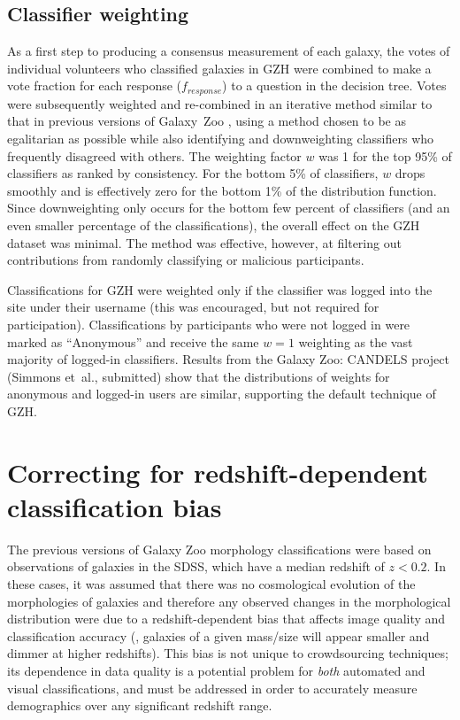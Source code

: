 \documentclass[a4paper,fleqn,usenatbib]{mnras}
\begin{document}
\subsection{Classifier weighting}\label{ssec:weighting}

As a first step to producing a consensus measurement of each galaxy, the votes
of individual volunteers who classified galaxies in GZH were combined to make a
vote fraction for each response ($f_{response}$) to a question in the decision
tree. Votes were subsequently weighted and re-combined in an iterative method
similar to that in previous versions of Galaxy~Zoo \citep{lan08,wil13}, using a
method chosen to be as egalitarian as possible while also identifying and
downweighting classifiers who frequently disagreed with others. The weighting
factor $w$ was 1 for the top 95\% of classifiers as ranked by consistency.
For the bottom 5\% of classifiers, $w$ drops smoothly and is
effectively zero for the bottom 1\% of the distribution function. Since
downweighting only occurs for the bottom few percent of classifiers (and an even smaller
percentage of the classifications), the overall effect on the GZH dataset was
minimal. The method was effective, however, at filtering out contributions from
randomly classifying or malicious participants.

Classifications for GZH were weighted only if the classifier was logged
into the site under their username (this was encouraged, but not required for
participation). Classifications by participants who were not logged in were marked as
``Anonymous'' and receive the same $w=1$ weighting as the vast majority of
logged-in classifiers. Results from the Galaxy Zoo: CANDELS project (Simmons et~al., submitted)
show that the distributions of weights for anonymous and
logged-in users are similar, supporting the default technique of GZH.


\section{Correcting for redshift-dependent classification bias}\label{sec:debiasing}

The previous versions of Galaxy Zoo morphology classifications
\citep{lin11,wil13} were based on observations of galaxies in the SDSS,
which have a median redshift of $z<0.2$. In these cases, it
was assumed that there was no cosmological evolution of the morphologies of
galaxies and therefore any observed changes in the morphological distribution
were due to a redshift-dependent bias that affects image quality and
classification accuracy (\ie, galaxies of a given mass/size will appear smaller
and dimmer at higher redshifts).  This bias is not unique to crowdsourcing
techniques; its dependence in data quality is a potential problem for
\emph{both} automated and visual classifications, and must be addressed in
order to accurately measure demographics over any significant redshift range. 
\end{document}
